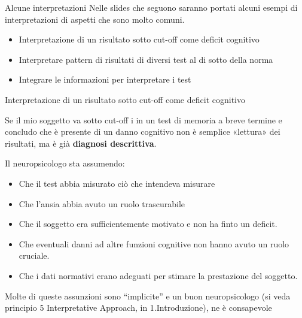 \documentclass[
  ignorenonframetext,
]{beamer}
\providecommand{\tightlist}{%
  \setlength{\itemsep}{0pt}\setlength{\parskip}{0pt}}
\begin{document}
\begin{frame}{Alcune interpretazioni}
\label{alcune-interpretazioni}
Nelle slides che seguono saranno portati alcuni esempi di
interpretazioni di aspetti che sono molto comuni.

\begin{itemize}
\tightlist
\item
  Interpretazione di un risultato sotto cut-off come deficit cognitivo
\item
  Interpretare pattern di risultati di diversi test al di sotto della
  norma
\item
  Integrare le informazioni per interpretare i test
\end{itemize}
\end{frame}

\begin{frame}{\normalsize Interpretazione di un risultato sotto cut-off
come deficit cognitivo}
\label{interpretazione-di-un-risultato-sotto-cut-off-come-deficit-cognitivo}
\small

Se il mio soggetto va sotto cut-off i in un test di memoria a breve
termine e concludo che è presente di un danno cognitivo non è semplice
«lettura» dei risultati, ma è già \textbf{diagnosi descrittiva}.

Il neuropsicologo sta assumendo:

\begin{itemize}
\tightlist
\item
  Che il test abbia misurato ciò che intendeva misurare \pause
\item
  Che l'ansia abbia avuto un ruolo trascurabile \pause
\item
  Che il soggetto era sufficientemente motivato e non ha finto un
  deficit. \pause
\item
  Che eventuali danni ad altre funzioni cognitive non hanno avuto un
  ruolo cruciale. \pause
\item
  Che i dati normativi erano adeguati per stimare la prestazione del
  soggetto. \pause
\end{itemize}

Molte di queste assunzioni sono ``implicite'' e un buon neuropsicologo
(si veda principio 5 Interpretative Approach, in 1.Introduzione), ne è
consapevole
\end{frame}
\end{document}
